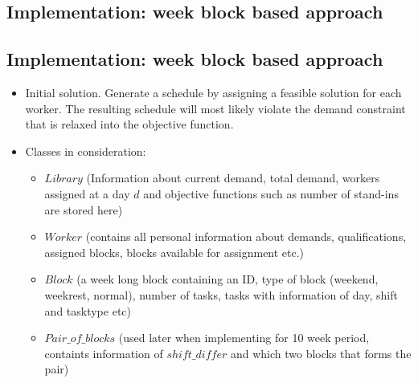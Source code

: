 \documentclass{article}
\begin{document}
	
	
	\subsection*{Implementation: week block based approach} 

	\subsection*{Implementation: week block based approach}
	\begin{itemize}
	\item Initial solution. Generate a schedule by assigning a feasible solution for each worker. The resulting schedule will most likely violate the demand constraint that is relaxed into the objective function.

	
	\item Classes in consideration:
		\begin{itemize}
		\item $Library$ (Information about current demand, total demand, workers assigned at a day $d$ and objective functions such as number of stand-ins are stored here)
		\item $Worker$ (contains all personal information about demands, qualifications, assigned blocks, blocks available for assignment etc.)
		\item $Block$ (a week long block containing an ID, type of block (weekend, weekrest, normal), number of tasks, tasks with information of day, shift and tasktype etc)
		\item $Pair\_of\_blocks$ (used later when implementing for 10 week period, containts information of $shift\_differ$ and which two blocks that forms the pair)
		\end{itemize}
		

\end{itemize}
\end{document}
